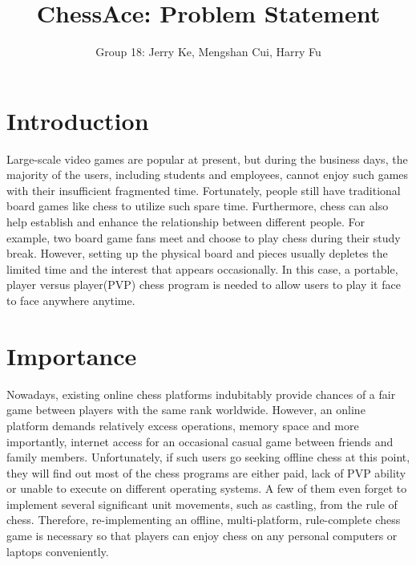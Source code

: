 \documentclass[12pt,letterpaper]{article}
\title{ChessAce: Problem Statement}
\author{Group 18: Jerry Ke, Mengshan Cui, Harry Fu}
\date{}
\begin{document}
\maketitle
\section{Introduction}
Large-scale video games are popular at present, but during the business days, the majority of the users, including students and employees, cannot enjoy such games with their insufficient fragmented time. Fortunately, people still have traditional board games like chess to utilize such spare time. Furthermore, chess can also help establish and enhance the relationship between different people. For example, two board game fans meet and choose to play chess during their study break. However, setting up the physical board and pieces usually depletes the limited time and the interest that appears occasionally. In this case, a portable, player versus player(PVP) chess program is needed to allow users to play it face to face anywhere anytime. 

\section{Importance}
Nowadays, existing online chess platforms indubitably provide chances of a fair game between players with the same rank worldwide. However, an online platform demands relatively excess operations, memory space and more importantly, internet access for an occasional casual game between friends and family members. 
\medskip
\newline
Unfortunately, if such users go seeking offline chess at this point, they will find out most of the chess programs are either paid, lack of PVP ability or unable to execute on different operating systems. A few of them even forget to implement several significant unit movements, such as castling, from the rule of chess. 
Therefore, re-implementing an offline, multi-platform, rule-complete chess game is necessary so that players can enjoy chess on any personal computers or laptops conveniently. 
\end{document}

